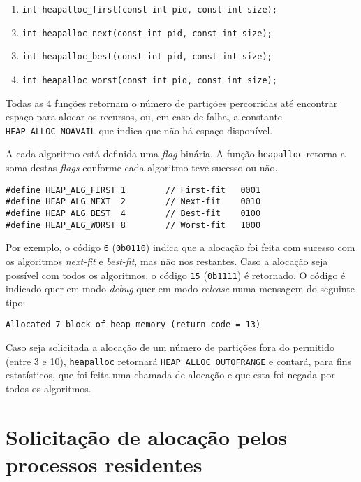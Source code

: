 \documentclass[10pt,oneside]{estiloUBI}
\begin{document}
	\begin{enumerate}
		\item \texttt{int heapalloc_first(const int pid, const int size);}
		\item \texttt{int heapalloc_next(const int pid, const int size);}
		\item \texttt{int heapalloc_best(const int pid, const int size);}
		\item \texttt{int heapalloc_worst(const int pid, const int size);}
	\end{enumerate}
	
	Todas as 4 funções retornam o número de partições percorridas até encontrar espaço para alocar os recursos, ou, em caso de falha, a constante \verb|HEAP_ALLOC_NOAVAIL| que indica que não há espaço disponível.
	
	A cada algoritmo está definida uma \textit{flag} binária. A função \verb|heapalloc| retorna a soma destas \textit{flags} conforme cada algoritmo teve sucesso ou não.
	
	\begin{verbatim}
#define HEAP_ALG_FIRST 1        // First-fit   0001
#define HEAP_ALG_NEXT  2        // Next-fit    0010
#define HEAP_ALG_BEST  4        // Best-fit    0100
#define HEAP_ALG_WORST 8        // Worst-fit   1000
	\end{verbatim}
	
	Por exemplo, o código \verb|6| (\verb|0b0110|) indica que a alocação foi feita com sucesso com os algoritmos \textit{next-fit} e \textit{best-fit}, mas não nos restantes. Caso a alocação seja possível com todos os algoritmos, o código \verb|15| (\verb|0b1111|) é retornado. O código é indicado quer em modo \textit{debug} quer em modo \textit{release} numa mensagem do seguinte tipo:
	
	\begin{verbatim}
Allocated 7 block of heap memory (return code = 13)
	\end{verbatim}
	
	Caso seja solicitada a alocação de um número de partições fora do permitido (entre 3 e 10), \verb|heapalloc| retornará \verb|HEAP_ALLOC_OUTOFRANGE| e contará, para fins estatísticos, que foi feita uma chamada de alocação e que esta foi negada por todos os algoritmos.
	
	
	
	\section{Solicitação de alocação pelos processos residentes}
	\label{ssec:heap:alloc}
	
\end{document}
